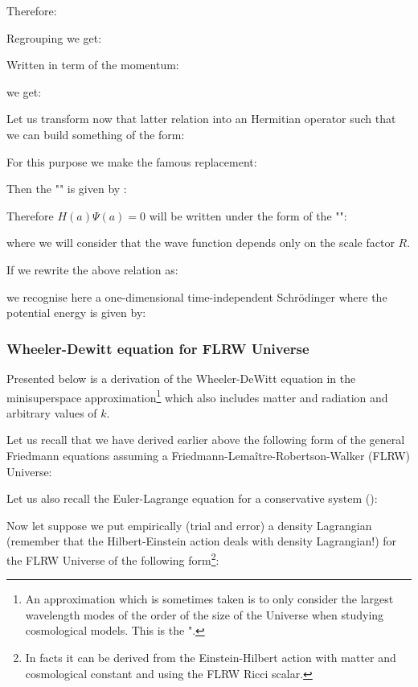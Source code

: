 	Therefore:
	
	Regrouping we get:
	
	Written in term of the momentum:
	
	we get:
	
	Let us transform now that latter relation into an Hermitian operator such that we can build something of the form:
	
	For this purpose we make the famous replacement:
	
	Then the "" is given by :
	
	Therefore $H(a)\Psi(a)=0$ will be written under the form of the "":
	
	where we will consider that the wave function depends only on the scale factor $R$.
	
	If we rewrite the above relation as:
	
	we recognise here a one-dimensional time-independent Schrödinger where the potential energy is given by:
	
	
	\subsubsection{Wheeler-Dewitt equation for FLRW Universe}
	Presented below is a derivation of the Wheeler-DeWitt equation in the minisuperspace approximation\footnote{An approximation which is sometimes taken is to only consider the largest wavelength modes of the order of the size of the Universe when studying cosmological models. This is the ".} which also includes matter and radiation and arbitrary values of $k$.

	Let us recall that we have derived earlier above the following form of 
the general Friedmann equations assuming a Friedmann-Lemaître-Robertson-Walker (FLRW) Universe:
	
	Let us also recall the Euler-Lagrange equation for a conservative system ():
	
	Now let suppose we put empirically (trial and error) a density Lagrangian (remember that the Hilbert-Einstein action deals with density Lagrangian!) for the FLRW Universe of the following form\footnote{In facts it can be derived from the Einstein-Hilbert action with matter and cosmological constant and using the FLRW Ricci scalar.}:
	
